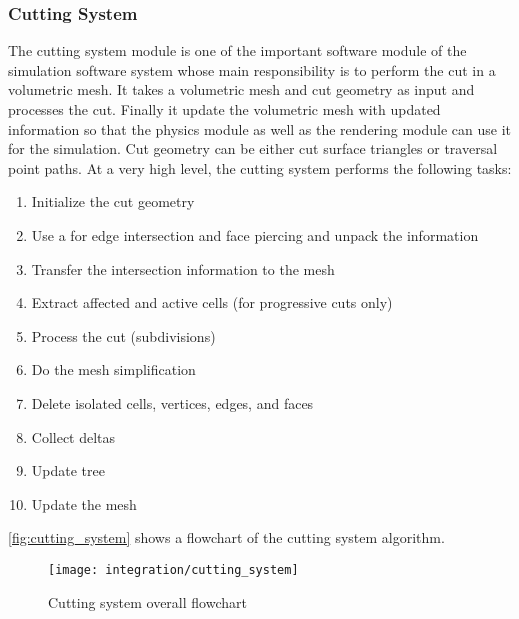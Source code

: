 \subsubsection{Cutting System}
\label{sec:cutting_system}
The cutting system module is one of the important software module of the simulation software system whose main responsibility is to perform the cut in a volumetric mesh. It takes a volumetric mesh and cut geometry as input and processes the cut. Finally it update the volumetric mesh with updated information so that the physics  module as well as the rendering module can use it for the simulation. Cut geometry can be either cut surface triangles or traversal point paths. At a very high level, the cutting system performs the following tasks:
\begin{enumerate}
  \item Initialize the cut geometry
  \item Use a  for edge intersection and face piercing and unpack the information
  \item Transfer the intersection information to the mesh
  \item Extract affected and active cells (for progressive cuts only) \item Process the cut (subdivisions)
  \item Do the mesh simplification
  \item Delete isolated cells, vertices, edges, and faces
  \item Collect deltas
  \item Update  tree
  \item Update the mesh
\end{enumerate}

\autoref{fig:cutting_system} shows a flowchart of the cutting system algorithm.
\begin{figure}
  \centering
  \texttt{[image: integration/cutting\_system]}
  \caption{Cutting system overall flowchart}
  \label{fig:cutting_system}
\end{figure}

